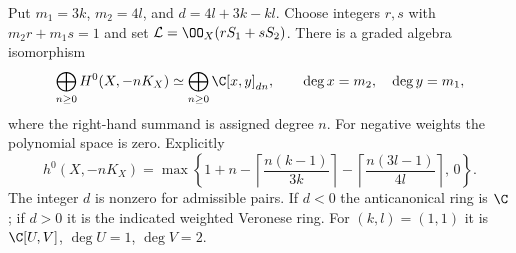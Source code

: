 \begin{proposition}\hypertarget{tag-01S6}{}\label{inv:B2.2}

Put $m_1=3k$, $m_2=4l$, and $d=4l+3k-kl$.
Choose integers $r,s$ with $m_2r+m_1s=1$ and set
$\mathcal L=\OO_X(rS_1+sS_2)$.
There is a graded algebra isomorphism
\[
\bigoplus_{n\ge0}H^0(X,-nK_X)
\simeq\bigoplus_{n\ge0}\C[x,y]_{dn},
\qquad\deg x=m_2,\quad\deg y=m_1,
\]
where the right-hand summand is assigned degree $n$.
For negative weights the polynomial space is zero. Explicitly
\[
h^0(X,-nK_X)=
\max\left\{1+n-\left\lceil\frac{n(k-1)}{3k}\right\rceil
-\left\lceil\frac{n(3l-1)}{4l}\right\rceil,\,0\right\}.
\]
The integer $d$ is nonzero for admissible pairs. If $d<0$ the
anticanonical ring is $\C$; if $d>0$ it is the indicated weighted
Veronese ring. For $(k,l)=(1,1)$ it is
$\C[U,V]$, $\deg U=1$, $\deg V=2$.
\end{proposition}


